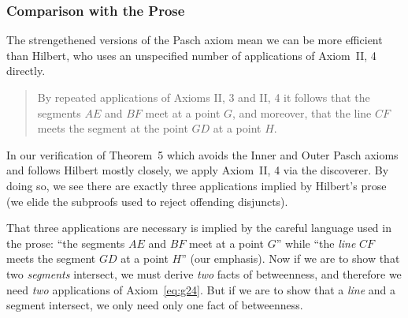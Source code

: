\subsubsection{Comparison with the Prose}
The strengethened versions of the Pasch axiom mean we can be more efficient than Hilbert, who uses an unspecified number of applications of Axiom~II, 4 directly.

\begin{quote}
By repeated applications of Axioms II, 3 and II, 4 it follows that the segments $AE$ and $BF$ meet at a point $G$, and moreover, that the line $CF$ meets the segment at the point $GD$ at a point $H$.
\end{quote}

In our verification of Theorem~5 which avoids the Inner and Outer Pasch axioms and follows Hilbert mostly closely, we apply Axiom~II, 4 via the  discoverer. By doing so, we see there are exactly three applications implied by Hilbert's prose (we elide the subproofs used to reject offending disjuncts).

\linebreak

That three applications are necessary is implied by the careful language used in the prose: ``the segments $AE$ and $BF$ meet at a point $G$'' while ``the \emph{line} $CF$ meets the segment $GD$ at a point $H$'' (our emphasis). Now if we are to show that two \emph{segments} intersect, we must derive \emph{two} facts of betweenness, and therefore we need \emph{two} applications of Axiom~\ref{eq:g24}. But if we are to show that a \emph{line} and a segment intersect, we only need only one fact of betweenness. 

